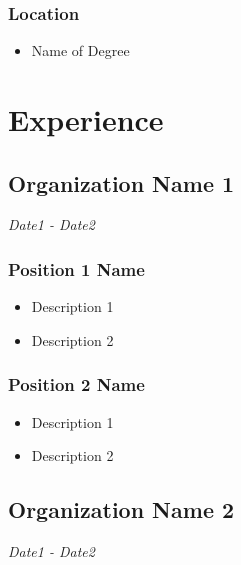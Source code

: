 \documentclass{article}
\renewcommand{\date}[1]{
    \hfill{\normalsize\textit{#1}}
}
\begin{document}
            \subsubsection{Location}
                \begin{itemize}
                    \item Name of Degree
                \end{itemize}
    
    \section{Experience}

        \subsection{Organization Name 1}\date{Date1 - Date2}
            \subsubsection{Position 1 Name}
                \begin{itemize}
                    \item Description 1
                    \item Description 2 
                \end{itemize}
            \subsubsection{Position 2 Name} %
                \begin{itemize}
                    \item Description 1
                    \item Description 2
                \end{itemize}
        \subsection{Organization Name 2}\date{Date1 - Date2}
\end{document}
